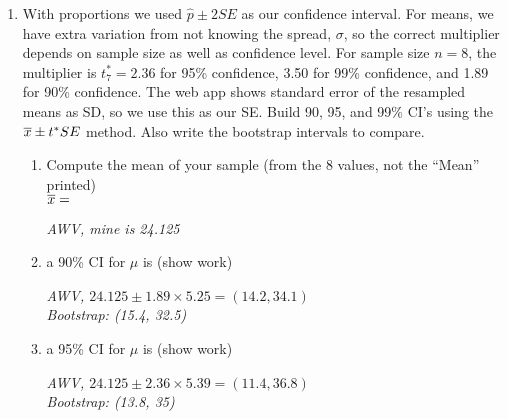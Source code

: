 \begin{enumerate}
\begin{enumerate}
\begin{students}
        \vspace{2cm}        
\end{students}
\begin{key}
 {\it The sample.  This is just like the simulation we did for
    proportions, but the method for computing the confidence interval
    is different.  We can get a ``good'' or ``bad'' sample, but given
    the sample, the method is consistent.  }
\end{key}
\end{enumerate}
\item With proportions we used $\widehat{p} \pm 2 SE$ as our
  confidence interval.  For means, we have extra variation from not
  knowing the spread, $\sigma$, so the correct multiplier depends on
  sample size as well as confidence level.  For sample size $n=8$, the
  multiplier is $t_7^* = 2.36$ for 95\% confidence, 3.50 for 99\%
  confidence, and 1.89 for 90\% confidence.  The web app shows
  standard error of the resampled means as SD, so we use this as our
  SE.  Build 90, 95, and 99\% CI's using the $\overline{x} \pm t^* SE$ method.
  Also write the bootstrap intervals to compare.\\
  \begin{enumerate} 
  \item Compute the mean of your sample (from the 8 values, not the
    ``Mean'' printed) \\ $\overline{x} =$ 
\begin{key} 
 {\it AWV, mine is 24.125}
\end{key}
\item a 90\% CI for $\mu$ is (show work)
\begin{students}
        \vspace{1cm}        
\end{students}
\begin{key}
 {\it AWV, $24.125 \pm  1.89 \times 5.25 = (14.2, 34.1)$\\
     Bootstrap: (15.4, 32.5)}
\end{key}
\item a 95\% CI for $\mu$ is (show work)
\begin{students}
        \vspace{1cm}        
\end{students}
\begin{key}
 {\it AWV, $24.125 \pm  2.36 \times 5.39 = (11.4, 36.8)$\\
     Bootstrap: (13.8, 35)}
\end{key}

\end{enumerate}
\end{enumerate}
